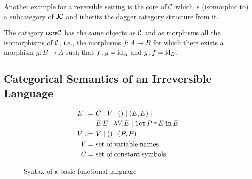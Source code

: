 \documentclass[runningheads,envcountsame]{llncs}
\begin{document}
    Another example for a reversible setting is the core of $\mathcal{C}$ which is (isomorphic to) a subcategory of $\mathsf{J}\mathcal{C}$ and inherits the dagger category structure from it.
    
    \begin{definition}
        The category $\mathsf{core}\mathcal{C}$ has the same objects as $\mathcal{C}$ and as morphisms all the isomorphisms of $\mathcal{C}$, i.e., the morphisms $f\colon A \to B$ for which there exists a morphism $g\colon B \to A$ such that $\comp{f}{g} = \id_A$ and $\comp{g}{f} = \id_B$.
    \end{definition}
    
\subsection{Categorical Semantics of an Irreversible Language}

    \begin{figure}
        \centering
        \begin{align*}
            E ::= & ~C \mid V \mid () \mid (E, E) \mid \\
                  & ~E\,E \mid \lambda V. E \mid \texttt{let}\,P\,\texttt{=}\,E\,\texttt{in}\,E \\
            V ::= & ~V \mid () \mid (P, P) \\
            V =   & ~\text{set of variable names} \\
            C =   & ~\text{set of constant symbols}
        \end{align*}
        \caption{Syntax of a basic functional language}
        \label{fig:syntax1}
    \end{figure}
    
\end{document}
